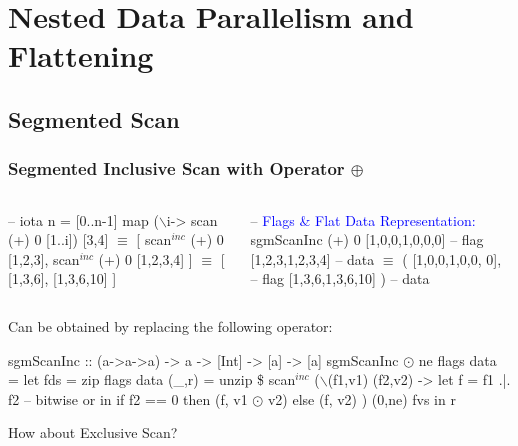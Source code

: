 \documentclass{beamer}
\newcommand{\blue}[1]{\textcolor{Blue}{{#1}}}
\renewcommand{\emph}[1]{\textcolor{structure}{#1}}
\newcommand{\emp}[1]{\textcolor{DikuRed}{ #1}}
\newcommand{\mymath}[1]{$ #1 $}
\newcommand{\myindu}[1]{^{#1}}
\begin{document}

\section{Nested Data Parallelism and Flattening}

\begin{frame}[fragile]
	\tableofcontents[currentsection]
\end{frame}

\subsection{Segmented Scan}

\begin{frame}[fragile,t]
  \frametitle{Segmented Inclusive Scan with Operator $\oplus$}

\begin{columns}
\begin{colorcode}
-- iota n = [0..n-1]
map (\mymath{\backslash}i-> scan (+) 0 [1..i]) [3,4] \emph{\mymath{\equiv}}
[ scan\mymath{\myindu{inc}} (+) 0 [1,2,3], 
  scan\mymath{\myindu{inc}} (+) 0 [1,2,3,4] ] 
      \emph{\mymath{\equiv}}
[ [1,3,6], [1,3,6,10] ]
\end{colorcode}
\begin{colorcode}
-- \blue{Flags \& Flat Data Representation:}
sgmScanInc (+) 0 [1,0,0,1,0,0,0] -- \emph{flag}
                 [1,2,3,1,2,3,4] -- \emp{data}
    \emph{\mymath{\equiv}}
( [1,0,0,1,0,0, 0],              -- \emph{flag}
  [1,3,6,1,3,6,10] )             -- \emp{data}
\end{colorcode}
\end{columns}
\medskip

Can be obtained by replacing the following operator:
\smallskip

\begin{colorcode}
sgmScanInc :: (a->a->a) -> a -> [Int] -> [a] -> [a]
sgmScanInc \mymath{\odot} ne flags data = 
  let fds = zip flags data
      (_,r) = unzip \$ 
              scan\mymath{\myindu{inc}} (\mymath{\backslash}(f1,v1) (f2,v2) -> 
                        let f = f1 .|. f2  -- bitwise or
                        in  if f2 == 0
                            then (f, v1 \mymath{\odot} v2)
                            else (f, v2)
                     ) (0,ne) fvs
  in  r
\end{colorcode}
\bigskip

\alert{How about Exclusive Scan?}

\end{frame}
\end{document}
